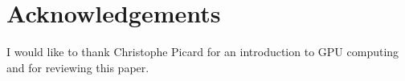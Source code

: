 \section{Acknowledgements}

I would like to thank Christophe Picard for an introduction to GPU computing and for reviewing this paper.
